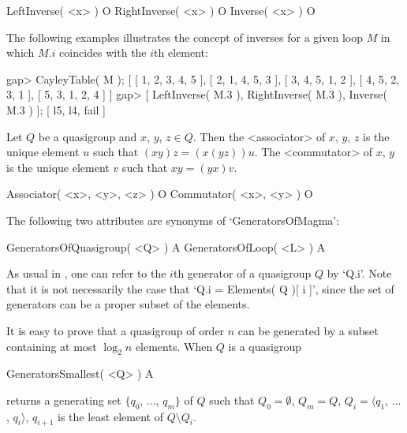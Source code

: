 \>LeftInverse( <x> ) O
\>RightInverse( <x> ) O
\>Inverse( <x> ) O

The following examples illustrates the concept of inverses for a given loop $M$
in which $M.i$ coincides with the $i$th element:

\beginexample
gap> CayleyTable( M );
[ [ 1, 2, 3, 4, 5 ],
  [ 2, 1, 4, 5, 3 ],
  [ 3, 4, 5, 1, 2 ],
  [ 4, 5, 2, 3, 1 ],
  [ 5, 3, 1, 2, 4 ] ]
gap> [ LeftInverse( M.3 ), RightInverse( M.3 ), Inverse( M.3 ) ];
[ l5, l4, fail ]
\endexample


Let $Q$ be a quasigroup and $x$, $y$, $z\in Q$. Then the <associator>
%
%
 of
$x$, $y$, $z$ is the unique element $u$ such that $(xy)z=(x(yz))u$. The
<commutator>
%
%
 of $x$, $y$ is the unique element $v$ such that $xy=(yx)v$.

\>Associator( <x>, <y>, <z> ) O
\>Commutator( <x>, <y> ) O


The following two attributes are synonyms of `GeneratorsOfMagma':

\>GeneratorsOfQuasigroup( <Q> ) A
\>GeneratorsOfLoop( <L> ) A

As usual in {\GAP}, one can refer to the $i$th generator of a quasigroup $Q$ by
`Q.i'. Note that it is not necessarily the case that `Q.i = Elements( Q )[ i
]', since the set of generators can be a proper subset of the elements.

It is easy to prove that a quasigroup of order $n$ can be generated by a subset
containing at most $\log_2{n}$ elements. When $Q$ is a quasigroup

\>GeneratorsSmallest( <Q> ) A

returns a generating set $\{q_0$, $\dots$, $q_m\}$ of $Q$ such that
$Q_0=\emptyset$, $Q_m=Q$, $Q_i=\langle q_1$, $\dots$, $q_i \rangle$, $q_{i+1}$
is the least element of $Q\setminus Q_i$.
